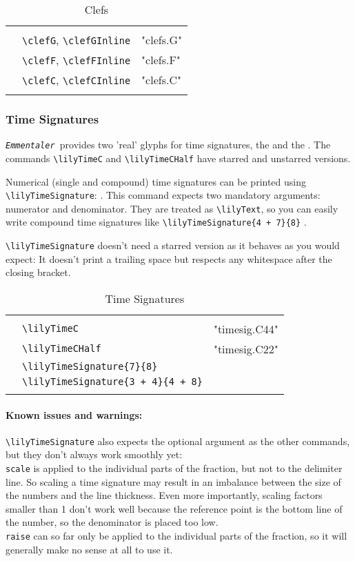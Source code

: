 \documentclass{article}
\newcommand*{\emmentaler}{\texttt{\textit{Emmentaler }}}
\newcommand*{\cmd}[1]{\texttt{\textbackslash #1}}
\newenvironment{reftable}[2]
	{%
		\begin{table}[ht]
			\begin{center}
				\caption{#1}
				\label{tab:#2}
				\begin{tabular}[t]{lll}
					\hline
					&\\
	}
	{%
					&\\
					\hline
				\end{tabular}
			\end{center}
		\end{table}
	}
\begin{document}
\begin{reftable}{Clefs}{clefs}
\clefGInline & \cmd{clefG}, \cmd{clefGInline} & "clefs.G"\\
\clefFInline & \cmd{clefF}, \cmd{clefFInline} & "clefs.F"\\
\clefCInline & \cmd{clefC}, \cmd{clefCInline} & "clefs.C"\\
\end{reftable}

\subsubsection{Time Signatures}
\label{subsubsec:timesignatures}
\emmentaler provides two 'real' glyphs for time signatures, the \lilyTimeC and the \lilyTimeCHalf*.
The commands \cmd{lilyTimeC} and \cmd{lilyTimeCHalf} have starred and unstarred versions. 

Numerical (single and compound) time signatures can be printed using \cmd{lilyTimeSignature}: .
This command expects two mandatory arguments: numerator and denominator.
They are treated as \cmd{lilyText}, so you can easily write compound time signatures like \cmd{lilyTimeSignature\{4 + 7\}\{8\}} .

\cmd{lilyTimeSignature} doesn't need a starred version as it behaves as you would expect: It doesn't print a trailing space but respects any whitespace after the closing bracket.

\begin{reftable}{Time Signatures}{timesignatures}
\lilyTimeC & \cmd{lilyTimeC} & "timesig.C44"\\
\lilyTimeCHalf & \cmd{lilyTimeCHalf} & "timesig.C22"\\
\lilyTimeSignature{7}{8} & \cmd{lilyTimeSignature\{7\}\{8\}}\\
\lilyTimeSignature{3 + 4}{4 + 8} & \cmd{lilyTimeSignature\{3 + 4\}\{4 + 8\}}\\
\end{reftable}

\paragraph*{Known issues and warnings:} \cmd{lilyTimeSignature} also expects the optional argument as the other commands, but they don't always work smoothly yet:\\
\texttt{scale} is applied to the individual parts of the fraction, but not to the delimiter line.
So scaling a time signature may result in an imbalance between the size of the numbers and the line thickness.
Even more importantly, scaling factors smaller than 1 don't work well because the reference point is the bottom line of the number, so the denominator is placed too low.\\
\texttt{raise} can so far only be applied to the individual parts of the fraction, so it will generally make no sense at all to use it.
\end{document}
